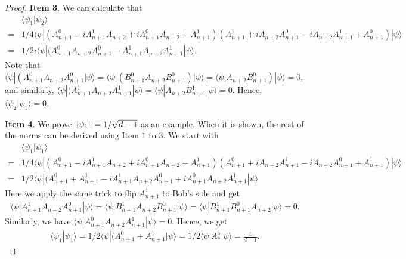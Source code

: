 \documentclass[11pt,letterpaper]{article}
\newcommand{\ket}[1]{|#1\rangle}
\newcommand{\bra}[1]{\langle#1|}
\newcommand{\braket}[2]{\langle#1|#2\rangle}
\DeclarePairedDelimiter{\norm}{\lVert}{\rVert}
\newcommand{\1}{\mathbb{1}}
\theoremstyle{definition}
\begin{document}
\begin{proof}
	\textbf{Item 3}. We can calculate that 
	\begin{align*}
		&\braket{\psi_1}{\psi_2}\\
	 = &1/4\bra{\psi}(A_{n+1}^0 - iA_{n+1}^1A_{n+2} + iA_{n+1}^0A_{n+2} +A_{n+1}^1)(A_{n+1}^1 + iA_{n+2}A_{n+1}^0 -iA_{n+2}A_{n+1}^1 + A_{n+1}^0)\ket{\psi}\\
	 =& 1/2i \bra{\psi}(A_{n+1}^0A_{n+2}A_{n+1}^0-A_{n+1}^1A_{n+2}A_{n+1}^1\ket{\psi}.
	\end{align*}
	Note that $ \bra{\psi}(A_{n+1}^0A_{n+2}A_{n+1}^0\ket{\psi} =  \bra{\psi}(B_{n+1}^0A_{n+2}B_{n+1}^0)\ket{\psi} =\bra{\psi}A_{n+2}B_{n+1}^0)\ket{\psi}
	= 0$, and similarly, $\bra{\psi}(A_{n+1}^1A_{n+2}A_{n+1}^1\ket{\psi} = \bra{\psi} A_{n+2}B_{n+1}^1 \ket{\psi} = 0$.
	Hence, $\braket{\psi_2}{\psi_1} = 0$.
	
	\textbf{Item 4}. We prove $\norm{\psi_1} = 1/\sqrt{d-1}$ as an example. When it is shown,
	the rest of the norms can be derived using Item $1$ to $3$.
	We start with
	\begin{align*}
		&\braket{\psi_1}{\psi_1} \\
		=&1/4\bra{\psi}(A_{n+1}^0 - iA_{n+1}^1A_{n+2} + iA_{n+1}^0A_{n+2} +A_{n+1}^1)(A_{n+1}^0 + iA_{n+2}A_{n+1}^1 -iA_{n+2}A_{n+1}^0 + A_{n+1}^1)\ket{\psi}\\
		=&1/2\bra{\psi}(A_{n+1}^0+A_{n+1}^1-iA_{n+1}^1A_{n+2}A_{n+1}^0+iA_{n+1}^0A_{n+2}A_{n+1}^1\ket{\psi}
	\end{align*}
	Here we apply the same trick to flip $A_{n+1}^1$ to Bob's side and get 
	\begin{align}
		\bra{\psi}A_{n+1}^1A_{n+2}A_{n+1}^0\ket{\psi} = \bra{\psi}B_{n+1}^1A_{n+2}B_{n+1}^0\ket{\psi} 
		= \bra{\psi}B_{n+1}^1B_{n+1}^0A_{n+2}\ket{\psi} = 0.
	\end{align}
	Similarly, we have $\bra{\psi}A_{n+1}^0A_{n+2}A_{n+1}^1\ket{\psi} = 0$.
	Hence, we get 
	\begin{align}
		\braket{\psi_1}{\psi_1} = 1/2\bra{\psi}(A_{n+1}^0+A_{n+1}^1\ket{\psi} = 1/2\bra{\psi}A_\ast^\diamond \ket{\psi} = \frac{1}{d-1}.
	\end{align}
	

\end{proof}
\end{document}
